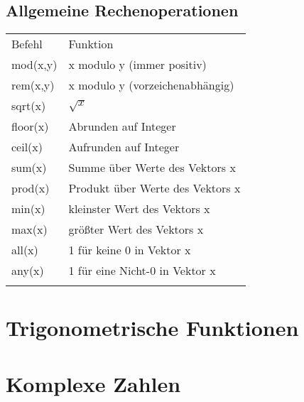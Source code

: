 \documentclass[fs]{latex4ei}
\begin{document}
\begin{multicols}{4}
{\subsection{Allgemeine Rechenoperationen}
\begin{tabular*}{\columnwidth}{@{\extracolsep\fill}ll@{}}
\ctrule
Befehl & Funktion \\\cmrule
mod(x,y) & x modulo y (immer positiv)\\
rem(x,y) & x modulo y (vorzeichenabhängig)\\
sqrt(x) & $ \sqrt{x}$\\
floor(x) & Abrunden auf Integer\\
ceil(x) & Aufrunden auf Integer\\
sum(x) & Summe über Werte des Vektors x\\
prod(x) & Produkt über Werte des Vektors x\\
min(x) & kleinster Wert des Vektors x\\
max(x) & größter Wert des Vektors x\\
all(x) & 1 für keine 0 in Vektor x\\
any(x) & 1 für eine Nicht-0 in Vektor x\\
\cbrule
\end{tabular*}
}

\section{Trigonometrische Funktionen}


\section{Komplexe Zahlen}


\end{multicols}
\end{document}
